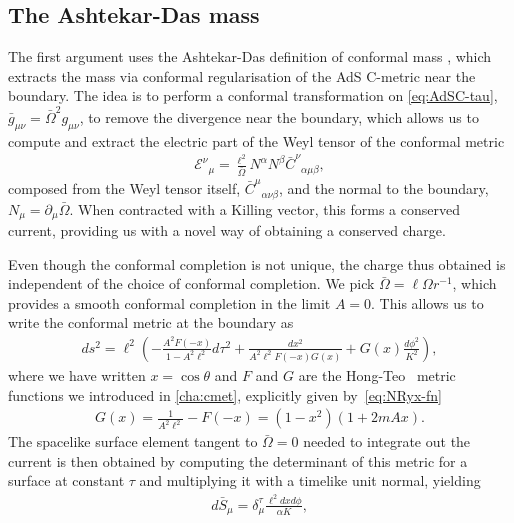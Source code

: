 \documentclass[
twoside,
openright,
frontopenright,
]{dmathesis}
\begin{document}
\subsection{The Ashtekar-Das mass}
\label{sec:ashtekar-das-mass}

The first argument uses the Ashtekar-Das definition of conformal mass
\cite{Ashtekar:1999jx,Das:2000cu}, which extracts the mass via conformal
regularisation of the AdS C-metric near the boundary.  The idea is to perform a
conformal transformation on \eqref{eq:AdSC-tau},
$\bar{g}_{\mu\nu} = {\bar{\Omega}}^{2}g_{\mu\nu}$, to remove the divergence near
the boundary, which allows us to compute and extract the electric part of the
Weyl tensor of the conformal metric
\begin{align}\label{eq:weylelectric}
  \mathcal{E}^\nu{}_\mu=\frac{\ell^{2}}{\bar{\Omega}}N^{\alpha }N^{\beta }
\bar{C}^{\nu}{}_{\alpha \mu \beta },
\end{align}
composed from the Weyl tensor itself, $\bar{C}^{\mu }{}_{\alpha \nu \beta }$, and
the normal to the boundary, $N_{\mu }=\partial _{\mu }{\bar{\Omega}}$. When
contracted with a Killing vector, this forms a conserved current, providing us
with a novel way of obtaining a conserved charge.

Even though the conformal completion is not unique, the charge thus obtained is
independent of the choice of conformal completion.  We pick
$\bar{\Omega}=\ell\Omega r^{-1} $, which provides a smooth conformal completion
in the limit $A=0$. This allows us to write the conformal metric at the boundary
as
\begin{align}
  \label{eq:bdymetric}
  ds^2%
  =\ell^2\left( -\frac{A^2 F(-x)}{1-A^2\ell^2}d\tau^2 +
  \frac{dx^2}{A^2\ell^2F(-x)G(x)} + G(x)\frac{d\phi^2}{K^2}\right),
\end{align}
where we have written $x=\cos\theta$ and $F$ and $G$ are the
Hong-Teo~\cite{Hong:2003gx} metric functions we introduced in \cref{cha:cmet},
explicitly given by~\eqref{eq:NRyx-fn}
\begin{align}
  \label{eq:FGhongteore}
  G(x) = \frac{1}{A^2\ell^2} - F(-x) = (1-x^2)(1+2 m A x).
\end{align}
The spacelike surface element tangent to $ \bar{\Omega}=0$ needed to integrate
out the current is then obtained by computing the determinant of this metric for
a surface at constant $\tau$ and multiplying it with a timelike unit normal,
yielding
\begin{align}\label{surfel}
d\bar{S}_{\mu }=\delta^{\tau }_{\mu }\frac{\ell^{2} dx d\phi}{\alpha K},
\end{align}
\end{document}
